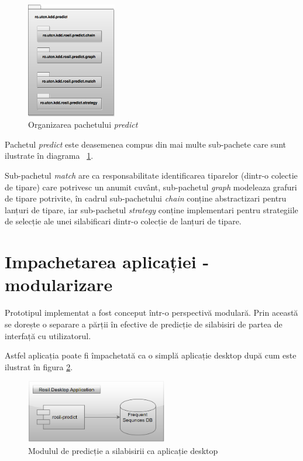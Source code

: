 \begin{figure}[h!]
    \centering
    \includegraphics[width=0.35\textwidth]{figures/rosil-predict-packages.png}
    \caption{Organizarea pachetului \textit{predict}}
    \label{fig:rosil-predict-packages}
\end{figure}

Pachetul \textit{predict} este deasemenea compus din mai multe sub-pachete care sunt ilustrate în diagrama ~\ref{fig:rosil-predict-packages}. 

Sub-pachetul \textit{match} are ca responsabilitate identificarea tiparelor (dintr-o colectie de tipare) care potrivesc un anumit cuvânt, sub-pachetul \textit{graph} modeleaza grafuri de tipare potrivite, în cadrul sub-pachetului \textit{chain} conține abstractizari pentru lanțuri de tipare, iar sub-pachetul \textit{strategy} conține implementari pentru strategiile de selecție ale unei silabificari dintr-o colecție de lanțuri de tipare. 

\section{Impachetarea aplicației - modularizare}

Prototipul implementat a fost conceput într-o perspectivă modulară. Prin această se dorește o separare a părții în efective de predicție de silabisiri de partea de interfață cu utilizatorul. 

Astfel aplicația poate fi împachetată ca o simplă aplicație desktop după cum este ilustrat în figura \ref{fig:rosil-desktop}.

\begin{figure}[h!]
    \centering
    \includegraphics[width=0.55\textwidth]{figures/rosil-desktop.png}
    \caption{Modulul de predicție a silabisirii ca aplicație desktop}
    \label{fig:rosil-desktop}
\end{figure}

